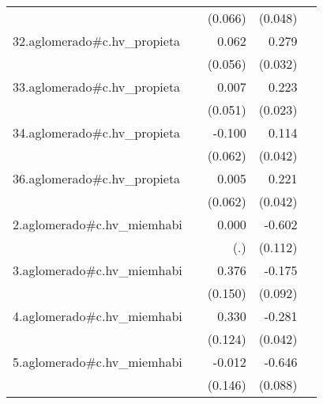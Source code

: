 {\begin{longtable}{l*{4}{D{.}{.}{-1}}}
            &                     &     (0.066)         &     (0.048)         &                     \\
\addlinespace
32.aglomerado#c.hv\_propieta&                     &       0.062         &       0.279\sym{***}&                     \\
            &                     &     (0.056)         &     (0.032)         &                     \\
\addlinespace
33.aglomerado#c.hv\_propieta&                     &       0.007         &       0.223\sym{***}&                     \\
            &                     &     (0.051)         &     (0.023)         &                     \\
\addlinespace
34.aglomerado#c.hv\_propieta&                     &      -0.100         &       0.114\sym{**} &                     \\
            &                     &     (0.062)         &     (0.042)         &                     \\
\addlinespace
36.aglomerado#c.hv\_propieta&                     &       0.005         &       0.221\sym{***}&                     \\
            &                     &     (0.062)         &     (0.042)         &                     \\
\addlinespace
2.aglomerado#c.hv\_miemhabi&                     &       0.000         &      -0.602\sym{***}&                     \\
            &                     &         (.)         &     (0.112)         &                     \\
\addlinespace
3.aglomerado#c.hv\_miemhabi&                     &       0.376\sym{*}  &      -0.175         &                     \\
            &                     &     (0.150)         &     (0.092)         &                     \\
\addlinespace
4.aglomerado#c.hv\_miemhabi&                     &       0.330\sym{**} &      -0.281\sym{***}&                     \\
            &                     &     (0.124)         &     (0.042)         &                     \\
\addlinespace
5.aglomerado#c.hv\_miemhabi&                     &      -0.012         &      -0.646\sym{***}&                     \\
            &                     &     (0.146)         &     (0.088)         &                     \\

\end{longtable}}
